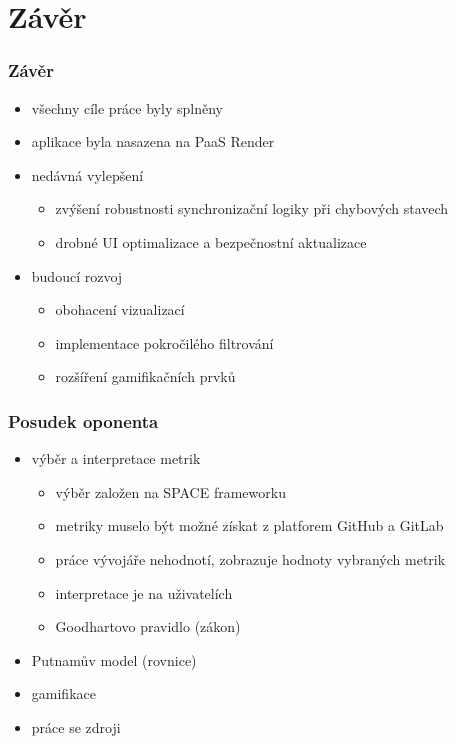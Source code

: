\documentclass[czech,sage]{ctufit-presentation}
\begin{document}
\section{Závěr}
\begin{frame}
    \frametitle{Závěr}
    \begin{itemize}
        \item všechny cíle práce byly splněny
        \item aplikace byla nasazena na PaaS Render
        \item nedávná vylepšení
        \begin{itemize}
            \item zvýšení robustnosti synchronizační logiky při chybových stavech
            \item drobné UI optimalizace a bezpečnostní aktualizace
        \end{itemize}
        \item budoucí rozvoj
        \begin{itemize}
            \item obohacení vizualizací
            \item implementace pokročilého filtrování
            \item rozšíření gamifikačních prvků
        \end{itemize}
    \end{itemize}
\end{frame}

\begin{plainFrame}[colourbg]
\end{plainFrame}

\begin{frame}
    \frametitle{Posudek oponenta}
    \begin{itemize}
        \item výběr a interpretace metrik
        \begin{itemize}
            \item výběr založen na SPACE frameworku
            \item metriky muselo být možné získat z platforem GitHub a GitLab
            \item práce vývojáře nehodnotí, zobrazuje hodnoty vybraných metrik
            \item interpretace je na uživatelích
            \item Goodhartovo pravidlo (zákon)
        \end{itemize}
        \item Putnamův model (rovnice)
        \item gamifikace
        \item práce se zdroji
    \end{itemize}
\end{frame}
\end{document}

